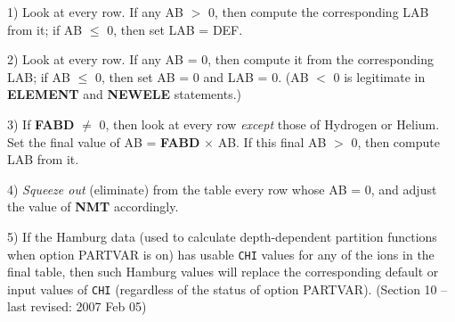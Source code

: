 1) Look at every row. If any AB $>$ 0, then compute the corresponding LAB
from it; if AB $\leq$ 0, then set LAB = DEF.

2) Look at every row. If any AB = 0, then compute it from the corresponding
LAB; if AB $\leq$ 0, then set AB = 0 and LAB = 0.
(AB $<$ 0 is legitimate in {\bf ELEMENT} and {\bf NEWELE} statements.)

3) If {\bf FABD} $\neq$ 0, then look at every row {\it except}
those of Hydrogen or Helium. Set the final value of AB = {\bf FABD} $\times$ AB.
If this final AB $>$ 0, then compute LAB from it.

4) {\it Squeeze out} (eliminate) from the table every row whose AB = 0,
and adjust the value of {\bf NMT} accordingly.

5) If the Hamburg data (used to calculate depth-dependent partition functions
when option PARTVAR is on) has usable {\tt CHI} values for any of the ions in
the final table, then such Hamburg values will replace the corresponding default
or input values of {\tt CHI} (regardless of the status of option PARTVAR).
\blankline
\vfill
\noindent (Section 10 -- last revised: 2007 Feb 05) %
{}
\ej
